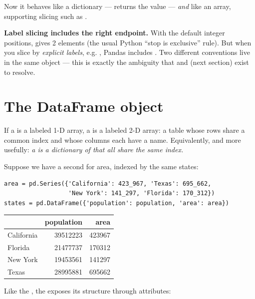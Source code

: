 \documentclass[11pt]{article}
\begin{document}
Now it behaves like a dictionary ---  returns the value --- \emph{and} like an array, supporting slicing such as .

\begin{pitfall}
\textbf{Label slicing includes the right endpoint.} With the default integer positions,  gives 2 elements (the usual Python ``stop is exclusive'' rule). But when you slice by \emph{explicit labels}, e.g. , Pandas includes . Two different conventions live in the same object --- this is exactly the ambiguity that  and  (next section) exist to resolve.
\end{pitfall}

\section{The DataFrame object}

If a  is a labeled 1-D array, a  is a labeled 2-D array: a table whose rows share a common index and whose columns each have a name. Equivalently, and more usefully: \emph{a  is a dictionary of  that all share the same index.}

Suppose we have a second  for area, indexed by the same states:

\begin{lstlisting}
area = pd.Series({'California': 423_967, 'Texas': 695_662,
                  'New York': 141_297, 'Florida': 170_312})
states = pd.DataFrame({'population': population, 'area': area})
\end{lstlisting}

\begin{center}
\renewcommand{\arraystretch}{1.2}
\begin{tabular}{l r r}
\toprule
 & \textbf{population} & \textbf{area} \\
\midrule
California & 39512223 & 423967 \\
Florida    & 21477737 & 170312 \\
New York   & 19453561 & 141297 \\
Texas      & 28995881 & 695662 \\
\bottomrule
\end{tabular}
\end{center}

Like the , the  exposes its structure through attributes:
\end{document}
